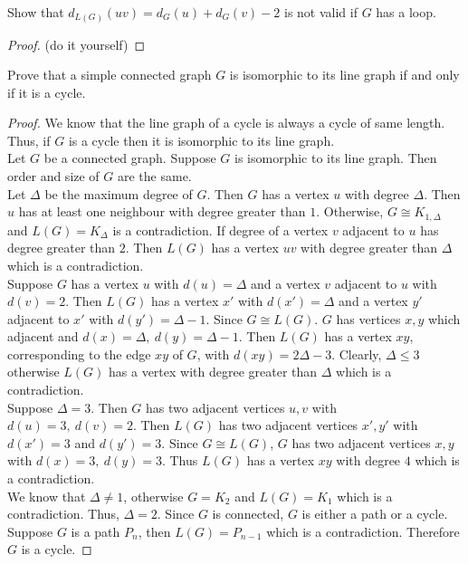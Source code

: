 \begin{exercise}
	Show that $d_{L(G)}(uv) = d_G(u) + d_G(v)-2$ is not valid if $G$ has a loop.
\end{exercise}
\begin{proof}
	(do it yourself)
\end{proof}

\begin{exercise}
	Prove that a simple connected graph $G$ is isomorphic to its line graph if and only if it is a cycle.
\end{exercise}
\begin{proof}
	We know that the line graph of a cycle is always a cycle of same length. Thus, if $G$ is a cycle then it is isomorphic to its line graph.\\

	Let $G$ be a connected graph. Suppose $G$ is isomorphic to its line graph. Then order and size of $G$ are the same.\\

	Let $\Delta$ be the maximum degree of $G$. Then $G$ has a vertex $u$ with degree $\Delta$. Then $u$ has at least one neighbour with degree greater than $1$. Otherwise, $G \cong K_{1,\Delta}$ and $L(G) = K_{\Delta}$ is a contradiction. If degree of a vertex $v$ adjacent to $u$ has degree greater than $2$. Then $L(G)$ has a vertex $uv$ with degree greater than $\Delta$ which is a contradiction.\\

	Suppose $G$ has a vertex $u$ with $d(u) = \Delta$ and a vertex $v$ adjacent to $u$ with $d(v) = 2$. Then $L(G)$ has a vertex $x'$ with $d(x') = \Delta$ and a vertex $y'$ adjacent to $x'$ with $d(y') = \Delta-1$. Since $G \cong L(G)$. $G$ has vertices $x,y$ which adjacent and $d(x) = \Delta,\ d(y) = \Delta-1$. Then $L(G)$ has a vertex $xy$, corresponding to the edge $xy$ of $G$, with $d(xy) = 2\Delta - 3$. Clearly, $\Delta \le 3$ otherwise $L(G)$ has a vertex with degree greater than $\Delta$ which is a contradiction.\\

	Suppose $\Delta  = 3$. Then $G$ has two adjacent vertices $u,v$ with $d(u) = 3,\ d(v) = 2$. Then $L(G)$ has two adjacent vertices $x',y'$ with $d(x') = 3$ and $d(y') = 3$. Since $G \cong L(G)$, $G$ has two adjacent vertices $x,y$ with $d(x) = 3,\ d(y) = 3$. Thus $L(G)$ has a vertex $xy$ with degree $4$ which is a contradiction.\\
	
	We know that $\Delta \ne 1$, otherwise $G = K_2$ and $L(G) = K_1$ which is a contradiction. Thus, $\Delta = 2$. Since $G$ is connected, $G$ is either a path or a cycle. Suppose $G$ is a path $P_n$, then $L(G) = P_{n-1}$ which is a contradiction. Therefore $G$ is a cycle.
\end{proof}

